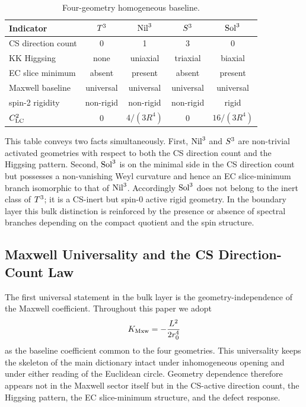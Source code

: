 \begin{table}[H]
\centering
\begin{tabular}{lcccc}
\toprule
Indicator & $T^3$ & $\mathrm{Nil}^3$ & $S^3$ & $\mathrm{Sol}^3$ \\
\midrule
CS direction count & 0 & 1 & 3 & 0 \\
KK Higgsing & none & uniaxial & triaxial & biaxial \\
EC slice minimum & absent & present & absent & present \\
Maxwell baseline & universal & universal & universal & universal \\
spin-2 rigidity & non-rigid & non-rigid & non-rigid & rigid \\
$C^2_{\mathrm{LC}}$ & $0$ & $4/(3R^4)$ & $0$ & $16/(3R^4)$ \\
\bottomrule
\end{tabular}
\caption{Four-geometry homogeneous baseline.}
\label{tab:baseline}
\end{table}

This table conveys two facts simultaneously.  First, $\mathrm{Nil}^3$ and $S^3$
are non-trivial activated geometries with respect to both the CS direction
count and the Higgsing pattern.  Second, $\mathrm{Sol}^3$ is on the minimal side
in the CS direction count but possesses a non-vanishing Weyl curvature and
hence an EC slice-minimum branch isomorphic to that of $\mathrm{Nil}^3$.
Accordingly $\mathrm{Sol}^3$ does not belong to the inert class of $T^3$; it is
a CS-inert but spin-0 active rigid geometry.  In the boundary layer this bulk
distinction is reinforced by the presence or absence of spectral branches
depending on the compact quotient and the spin structure.

\subsection{Maxwell Universality and the CS Direction-Count Law}
\label{sec:baseline:maxwell}

The first universal statement in the bulk layer is the geometry-independence
of the Maxwell coefficient.  Throughout this paper we adopt
\begin{equation}
  K_{\mathrm{Mxw}} = -\frac{L^2}{2r_0^4}
\end{equation}
as the baseline coefficient common to the four geometries.  This universality
keeps the skeleton of the main dictionary intact under inhomogeneous opening
and under either reading of the Euclidean circle.  Geometry dependence
therefore appears not in the Maxwell sector itself but in the CS-active
direction count, the Higgsing pattern, the EC slice-minimum structure, and
the defect response.

